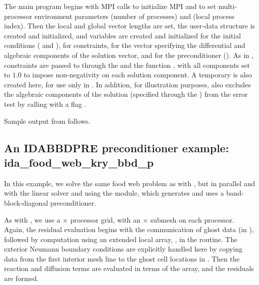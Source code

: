 The  main program begins with MPI calls to initialize MPI and to
set multi-processor environment parameters  (number of processes) and
 (local process index).  Then the local and global vector lengths are set,
the user-data structure  is created and initialized, and 
variables are created and initialized for the initial conditions ( and
), for constraints, for the vector  specifying the differential 
and algebraic components of the solution vector, and for the preconditioner
().  As in , constraints are passed to {\ida} through the
  and the function , with
all components set to $1.0$ to impose non-negativity on each solution component.
A temporary   is also created here, for use only in
.  In addition, for illustration purposes,
 also excludes the algebraic components of the solution
(specified through the  ) from the error test by calling
 with a flag .

Sample output from  follows.


\subsection{An IDABBDPRE preconditioner example: ida\_food\_web\_kry\_bbd\_p}\label{ss:idaFoodWeb_bbd_p}

In this example, we solve the same food web problem as with
, but in parallel and with the {\sunlinsolspgmr} linear solver and
using the {\idabbdpre} module, which generates and uses a band-block-diagonal 
preconditioner.

As with , we use a  $\times$  processor grid, with
an  $\times$  submesh on each processor.  Again, the residual
evaluation begins with the communication of ghost data (in ),
followed by computation using an extended local array, , in the
 routine.
The exterior Neumann boundary conditions are explicitly handled here
by copying data from the first interior mesh line to the ghost cell
locations in .  Then the reaction and diffusion terms are
evaluated in terms of the  array, and the residuals are formed.

